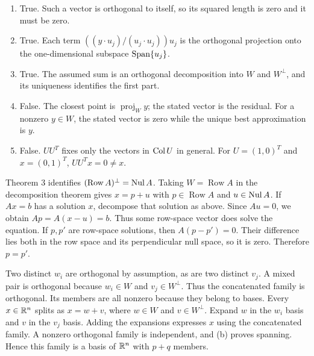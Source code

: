 \begin{enumerate}[label=(\alph*)]
\item True. Such a vector is orthogonal to itself, so its squared length
is zero and it must be zero.
\item True. Each term $((y\cdot u_j)/(u_j\cdot u_j))u_j$ is the
orthogonal projection onto the one-dimensional subspace $\operatorname{Span}\{u_j\}$.
\item True. The assumed sum is an orthogonal decomposition into
$W$ and $W^\perp$, and its uniqueness identifies the first part.
\item False. The closest point is $\operatorname{proj}_Wy$; the stated
vector is the residual. For a nonzero $y\in W$, the stated vector is
zero while the unique best approximation is $y$.
\item False. $UU^T$ fixes only the vectors in $\operatorname{Col} U$ in general.
For $U=(1,0)^T$ and $x=(0,1)^T$, $UU^Tx=0\ne x$.
\end{enumerate}

Theorem 3 identifies $(\operatorname{Row}A)^\perp=\operatorname{Nul} A$.
Taking $W=\operatorname{Row}A$ in the decomposition theorem gives
$x=p+u$ with $p\in\operatorname{Row}A$ and $u\in\operatorname{Nul} A$.
If $Ax=b$ has a solution $x$, decompose that solution as above.
Since $Au=0$, we obtain $Ap=A(x-u)=b$. Thus some row-space
vector does solve the equation.
If $p,p'$ are row-space solutions, then $A(p-p')=0$.
Their difference lies both in the row space and its perpendicular null
space, so it is zero. Therefore $p=p'$.

Two distinct $w_i$ are orthogonal by assumption, as are two distinct
$v_j$. A mixed pair is orthogonal because $w_i\in W$ and
$v_j\in W^\perp$. Thus the concatenated family is orthogonal.
Its members are all nonzero because they belong to bases.
Every $x\in\mathbb{R}^n$ splits as $x=w+v$, where $w\in W$ and
$v\in W^\perp$. Expand $w$ in the $w_i$ basis and $v$ in the $v_j$
basis. Adding the expansions expresses $x$ using the concatenated family.
A nonzero orthogonal family is independent, and (b) proves spanning.
Hence this family is a basis of $\mathbb{R}^n$ with $p+q$ members.

